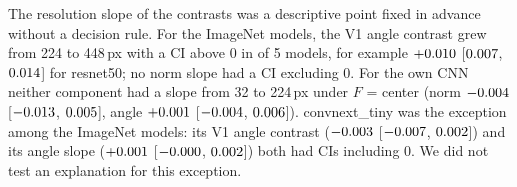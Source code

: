 The resolution slope of the contrasts was a descriptive point fixed in advance without a
decision rule. For the ImageNet models, the V1 angle contrast grew from 224 to 448\,px
with a CI above 0 in \SepSlopeAngleCiPositive{} of 5 models, for example
$+0.010$ [$0.007$,
$0.014$] for resnet50; no norm slope had a CI excluding 0. For
the own CNN neither component had a slope from 32 to 224\,px under $F$ = center (norm
$-0.004$ [$-0.013$, $0.005$], angle
$+0.001$ [$-0.004$, $0.006$]).
convnext\_tiny was the exception among the ImageNet models: its V1 angle contrast
($-0.003$ [$-0.007$,
$0.002$]) and its angle slope ($+0.001$
[$-0.000$, $0.002$]) both had CIs
including 0. We did not test an explanation for this exception.
